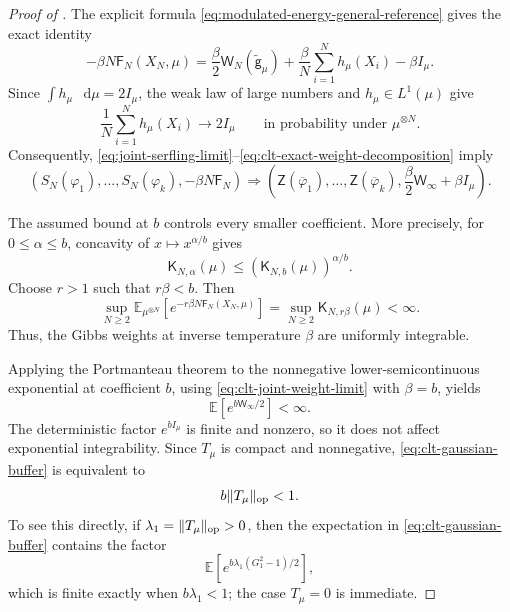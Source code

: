 \documentclass[11pt,reqno]{amsart}
\numberwithin{equation}{section}
\theoremstyle{plain}
\theoremstyle{definition}
\DeclarePairedDelimiter{\norm}{\lVert}{\rVert}
\newcommand{\dd}{\mathop{}\!\mathrm d}
\newcommand{\E}{\mathbb E}
\newcommand{\op}{\mathrm{op}}
\newcommand{\be}{\beta}
\newcommand{\al}{\alpha}
\newcommand{\g}{\mathsf g}
\newcommand{\K}{\mathsf K}
\newcommand{\Fr}{\mathsf F}
\newcommand{\tl}{\widetilde}
\newcommand{\XN}{X_N}
\begin{document}
\begin{proof}[Proof of ]
The explicit formula \eqref{eq:modulated-energy-general-reference} gives the exact identity
\begin{equation}
 -\be N\Fr_N(\XN,\mu)
 =\frac\be2\mathsf W_N(\tl{\g}_{\mu})
 +\frac\be N\sum_{i=1}^Nh_\mu(X_i)
 -\be I_\mu.
 \label{eq:clt-exact-weight-decomposition}
\end{equation}
Since \(\int h_\mu\,\dd\mu=2I_\mu\), the weak law of large numbers and \(h_\mu\in L^1(\mu)\) give
\begin{equation}
 \frac1N\sum_{i=1}^Nh_\mu(X_i)
 \longrightarrow2I_\mu
 \qquad\text{in probability under }\mu^{\otimes N}.
 \label{eq:clt-one-body-law-large-numbers}
\end{equation}
Consequently, \eqref{eq:joint-serfling-limit}--\eqref{eq:clt-exact-weight-decomposition} imply
\begin{equation}
 \left(S_N(\varphi_1),\ldots,S_N(\varphi_k),
 -\be N\Fr_N\right)
 \Longrightarrow
 \left(\mathsf Z(\overline\varphi_1),\ldots,
 \mathsf Z(\overline\varphi_k),
 \frac\be2\mathsf W_\infty+\be I_\mu\right).
 \label{eq:clt-joint-weight-limit}
\end{equation}

The assumed bound at $b$ controls every smaller coefficient.  More precisely, for $0\leq\al\leq b$, concavity of $x\mapsto x^{\al/b}$ gives
\begin{equation}
 \K_{N,\al}(\mu)
 \leq\left(\K_{N,b}(\mu)\right)^{\al/b}.
 \label{eq:clt-temperature-monotonicity}
\end{equation}
Choose $r>1$ such that $r\be<b$.  Then
\begin{equation}
 \sup_{N\geq2}
 \E_{\mu^{\otimes N}}
 \left[e^{-r\be N\Fr_N(\XN,\mu)}\right]
 =\sup_{N\geq2}\K_{N,r\be}(\mu)<\infty.
 \label{eq:clt-weight-uniform-integrability}
\end{equation}
Thus, the Gibbs weights at inverse temperature $\be$ are uniformly integrable.

Applying the Portmanteau theorem to the nonnegative lower-semicontinuous exponential at coefficient $b$, using \eqref{eq:clt-joint-weight-limit} with $\be=b$, yields
\begin{equation}
 \E\left[e^{b\mathsf W_\infty/2}\right]<\infty.
 \label{eq:clt-gaussian-buffer}
\end{equation}
The deterministic factor $e^{bI_{\mu}}$ is finite and nonzero, so it does not affect exponential integrability.  Since $T_{\mu}$ is compact and nonnegative, \eqref{eq:clt-gaussian-buffer} is equivalent to
\begin{equation}
 b\norm{T_{\mu}}_{\op}<1.
 \label{eq:clt-strict-spectral-gap-proof}
\end{equation}
To see this directly, if $\lambda_1=\norm{T_{\mu}}_{\op}>0$, then the expectation in \eqref{eq:clt-gaussian-buffer} contains the factor
\begin{equation}
 \E\left[e^{b\lambda_1(G_1^2-1)/2}\right],
 \label{eq:clt-top-mode-factor}
\end{equation}
which is finite exactly when $b\lambda_1<1$; the case $T_{\mu}=0$ is immediate.


\end{proof}
\end{document}
